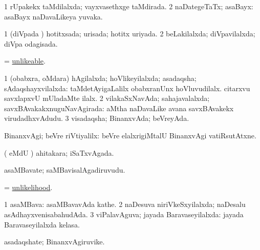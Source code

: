 \bentry
{} 
\gl{\gu}
\expl{}
\bmng
\bnum
\num{1} rUpakekx taMdilalxda; vayxvasethxge taMdirada. 
\num{2} naDategeTaTx; asaBayx:  asaBayx naDavaLikeya yuvaka. 
\enum
\emng
\eentry

\bentry
{} 
\gl{\gu}
\expl{}
\bmng
\bnum
\num{1} (diVpada \vi) hotitxsada; urisada; hotitx uriyada. 
\num{2} beLakilalxda; diVpavilalxda; diVpa odagisada. 
\enum
\emng
\eentry

\bentry
{} 
\gl{\gu}
\expl{}
\bmng
= \hyperlink{unlikeable}{unlikeable}. 
\emng
\eentry

\bentry
{} 
\gl{\gu}
\expl{}
\bmng
\bnum
\num{1} (obabxra, oMdara) hAgilalxda; hoVlikeyilalxda; asadaqsha; sAdaqshayxvilalxda:  taMdetAyigaLalilx obabxranUnx hoVluvudilalx.  citarxvu savxlapxvU mUladaMte ilalx. 
\num{2} vilakaSxNavAda; sahajavalalxda; savxBAvakakxnuguNavAgirada:  aMtha naDavaLike avana savxBAvakekx virudadhxvAdudu. 
\num{3} visadaqsha; BinanxvAda; beVreyAda. 
\enum
\emng
\eentry

\bentry
{} 
\gl{\upa}
\expl{}
\bmng
BinanxvAgi; beVre riVtiyalilx:  beVre elalxrigiMtalU BinanxvAgi vatiRsutAtxne. 
\emng
\eentry

\bentry
{} 
\gl{\gu}
\expl{}
\bmng
( eMdU \parx) ahitakara; iSaTxvAgada. 
\emng
\eentry

\bentry
{} 
\gl{\nA}
\expl{}
\bmng
asaMBavate; saMBavisalAgadiruvudu. 
\emng
\eentry

\bentry
{} 
\gl{\nA}
\expl{}
\bmng
= \hyperlink{unlikelihood}{unlikelihood}. 
\emng
\eentry

\bentry
{} 
\gl{\gu}
\bmng
\bnum
\num{1} asaMBava:  asaMBavavAda kathe. 
\num{2} naDesuva niriVkeSxyilalxda; naDesalu asAdhayxvenisabahudAda. 
\num{3} viPalavAguva; jayada Baravaseyilalxda:  jayada Baravaseyilalxda kelasa. 
\enum
\emng
\eentry

\bentry
{} 
\gl{\nA}
\expl{}
\bmng
asadaqshate; BinanxvAgiruvike. 
\emng
\eentry

